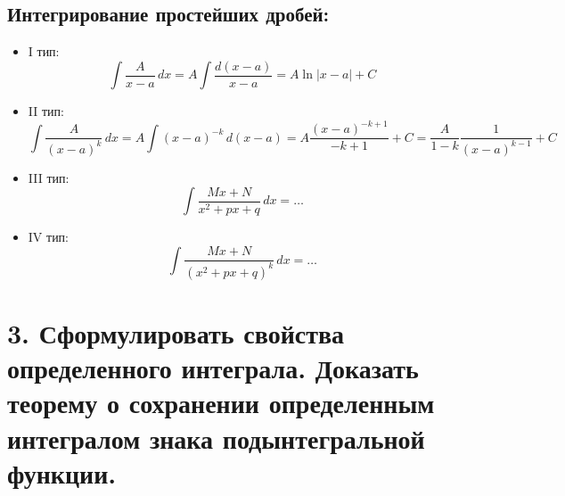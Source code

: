 \documentclass[11pt]{article}
\begin{document}
\subsection*{Интегрирование простейших дробей:}
\begin{itemize}
\item I тип:
\[\int \frac{A}{x - a} \, dx = A \int \frac{d(x - a)}{x - a} = A \ln |x - a| + C\]
\item II тип: \[\int \frac{A}{(x - a)^k} \, dx = A \int (x - a)^{-k} \, d(x - a) = A \frac{{(x - a)^{-k+1}}}{-k + 1} + C = \frac{A}{1 - k} \frac{1}{(x-a)^{k-1}} + C\]
\item III тип: \[\int \frac{{Mx + N}}{x^2 + px + q} \, dx = \dots\]
\item IV тип: \[\int \frac{{Mx + N}}{(x^2 + px + q)^k} \, dx = \dots\]
\end{itemize}

\section*{3. Сформулировать свойства определенного интеграла. Доказать теорему о сохранении определенным интегралом знака подынтегральной функции.}
\end{document}
